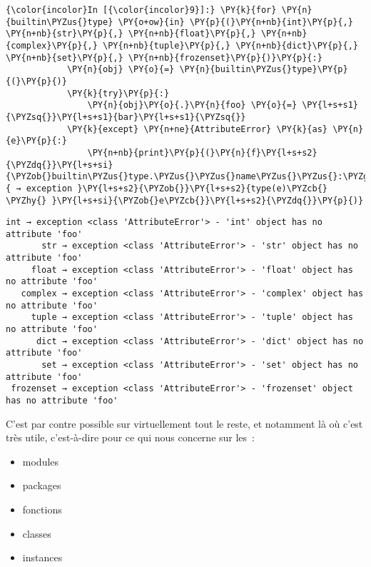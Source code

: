     \begin{Verbatim}[commandchars=\\\{\}]
{\color{incolor}In [{\color{incolor}9}]:} \PY{k}{for} \PY{n}{builtin\PYZus{}type} \PY{o+ow}{in} \PY{p}{(}\PY{n+nb}{int}\PY{p}{,} \PY{n+nb}{str}\PY{p}{,} \PY{n+nb}{float}\PY{p}{,} \PY{n+nb}{complex}\PY{p}{,} \PY{n+nb}{tuple}\PY{p}{,} \PY{n+nb}{dict}\PY{p}{,} \PY{n+nb}{set}\PY{p}{,} \PY{n+nb}{frozenset}\PY{p}{)}\PY{p}{:}
            \PY{n}{obj} \PY{o}{=} \PY{n}{builtin\PYZus{}type}\PY{p}{(}\PY{p}{)}
            \PY{k}{try}\PY{p}{:} 
                \PY{n}{obj}\PY{o}{.}\PY{n}{foo} \PY{o}{=} \PY{l+s+s1}{\PYZsq{}}\PY{l+s+s1}{bar}\PY{l+s+s1}{\PYZsq{}}
            \PY{k}{except} \PY{n+ne}{AttributeError} \PY{k}{as} \PY{n}{e}\PY{p}{:} 
                \PY{n+nb}{print}\PY{p}{(}\PY{n}{f}\PY{l+s+s2}{\PYZdq{}}\PY{l+s+si}{\PYZob{}builtin\PYZus{}type.\PYZus{}\PYZus{}name\PYZus{}\PYZus{}:\PYZgt{}10\PYZcb{}}\PY{l+s+s2}{ → exception }\PY{l+s+s2}{\PYZob{}}\PY{l+s+s2}{type(e)\PYZcb{} \PYZhy{} }\PY{l+s+si}{\PYZob{}e\PYZcb{}}\PY{l+s+s2}{\PYZdq{}}\PY{p}{)}
\end{Verbatim}


    \begin{Verbatim}[commandchars=\\\{\}]
       int → exception <class 'AttributeError'> - 'int' object has no attribute 'foo'
       str → exception <class 'AttributeError'> - 'str' object has no attribute 'foo'
     float → exception <class 'AttributeError'> - 'float' object has no attribute 'foo'
   complex → exception <class 'AttributeError'> - 'complex' object has no attribute 'foo'
     tuple → exception <class 'AttributeError'> - 'tuple' object has no attribute 'foo'
      dict → exception <class 'AttributeError'> - 'dict' object has no attribute 'foo'
       set → exception <class 'AttributeError'> - 'set' object has no attribute 'foo'
 frozenset → exception <class 'AttributeError'> - 'frozenset' object has no attribute 'foo'

    \end{Verbatim}

    C'est par contre possible sur virtuellement tout le reste, et notamment
là où c'est très utile, c'est-à-dire pour ce qui nous concerne sur les~:

\begin{itemize}
\tightlist
\item
  modules
\item
  packages
\item
  fonctions
\item
  classes
\item
  instances
\end{itemize}


    
    
    
